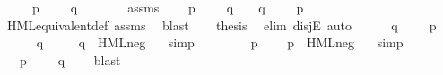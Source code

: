 \begin{isabellebody}
\ \ \ {\isacartoucheopen}{\isasymexists}\ {\isasymphi}{\isachardot}{\kern0pt}\ p\ {\isasymTurnstile}\ {\isasymphi}\ {\isasymand}\ {\isasymnot}\ q\ {\isasymTurnstile}\ {\isasymphi}{\isacartoucheclose}\isanewline
%
\isadelimproof
%
\endisadelimproof
%
\isatagproof
{}\isamarkupfalse%
\ {\isacharminus}{\kern0pt}\isanewline
\ \ \isamarkupfalse%
\ assms\ \isamarkupfalse%
\ {\isasymphi}\ \ {\isacartoucheopen}p\ {\isasymTurnstile}\ {\isasymphi}\ {\isasymand}\ {\isasymnot}\ q\ {\isasymTurnstile}\ {\isasymphi}\ {\isasymor}\ q\ {\isasymTurnstile}\ {\isasymphi}\ {\isasymand}\ {\isasymnot}\ p\ {\isasymTurnstile}\ {\isasymphi}{\isacartoucheclose}\isanewline
\ \ \ \ \isamarkupfalse%
\ HML{\isacharunderscore}{\kern0pt}equivalent{\isacharunderscore}{\kern0pt}def\ assms\ \isamarkupfalse%
\ blast\isanewline
\ \ \isamarkupfalse%
\ {\isacharquery}{\kern0pt}thesis\ \isamarkupfalse%
\ {\isacharparenleft}{\kern0pt}elim\ disjE{\isacharcomma}{\kern0pt}\ auto{\isacharparenright}{\kern0pt}\isanewline
\ \ \ \ \isamarkupfalse%
\ {\isacartoucheopen}q\ {\isasymTurnstile}\ {\isasymphi}{\isacartoucheclose}\ \ {\isacartoucheopen}{\isasymnot}\ p\ {\isasymTurnstile}\ {\isasymphi}{\isacartoucheclose}\isanewline
\ \ \ \ \isamarkupfalse%
\ {\isacartoucheopen}q\ {\isasymTurnstile}\ {\isasymphi}{\isacartoucheclose}\ \isamarkupfalse%
\ {\isacartoucheopen}{\isasymnot}\ q\ {\isasymTurnstile}\ HML{\isacharunderscore}{\kern0pt}neg\ {\isasymphi}{\isacartoucheclose}\ \isamarkupfalse%
\ simp\isanewline
\ \ \ \ \isamarkupfalse%
\ \isamarkupfalse%
\ {\isacartoucheopen}{\isasymnot}\ p\ {\isasymTurnstile}\ {\isasymphi}{\isacartoucheclose}\ \isamarkupfalse%
\ {\isacartoucheopen}p\ {\isasymTurnstile}\ HML{\isacharunderscore}{\kern0pt}neg\ {\isasymphi}{\isacartoucheclose}\ \isamarkupfalse%
\ simp\isanewline
\ \ \ \ \isamarkupfalse%
\ \isamarkupfalse%
\ {\isacartoucheopen}{\isasymexists}\ {\isasymphi}{\isachardot}{\kern0pt}\ p\ {\isasymTurnstile}\ {\isasymphi}\ {\isasymand}\ {\isasymnot}\ q\ {\isasymTurnstile}\ {\isasymphi}{\isacartoucheclose}\ \isamarkupfalse%
\ blast\isanewline
\ \ \isamarkupfalse%
\isanewline
{}\isamarkupfalse%
%
\endisatagproof
{\isafoldproof}%
%
\isadelimproof
\isanewline
%
\endisadelimproof
\isanewline

\end{isabellebody}

